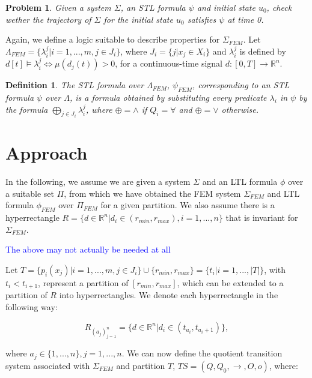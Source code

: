 \documentclass{article}
\newtheorem{definition}{Definition}
\newtheorem{problem}{Problem}
\newcommand*{\R}{\mathbb{R}}
\newcommand*{\fran}[1]{\textcolor{blue}{#1}}
\begin{document}
\begin{problem}
    Given a system $\Sigma$, an STL formula $\psi$ and initial state $u_0$,
    check wether the trajectory of $\Sigma$ for the initial state $u_0$
    satisfies $\psi$ at time 0.
\end{problem}

Again, we define a logic suitable to describe properties for $\Sigma_{FEM}$. Let
$\Lambda_{FEM} = \{\lambda_i^j | i = 1,...,m, j \in J_i\}$, where $J_i= \{j |
x_j \in X_i\}$ and $\lambda_i^j$ is defined by $d[t] \models \lambda_i^j \iff
\mu(d_j(t)) > 0$, for a continuous-time signal $d : [0, T] \to \R^n$.

\begin{definition}
    The STL formula over $\Lambda_{FEM}$, $\psi_{FEM}$, corresponding to an STL
    formula $\psi$ over $\Lambda$, is a formula obtained by substituting every
    predicate $\lambda_i$ in $\psi$ by the formula $\bigoplus_{j \in J_i}
    \lambda_i^j$, where $\oplus = \wedge$ if $Q_i = \forall$ and $\oplus = \vee$
    otherwise.
\end{definition}

\section{Approach}

In the following, we assume we are given a system $\Sigma$ and an LTL formula
$\phi$ over a suitable set $\Pi$, from which we have obtained the 
FEM system $\Sigma_{FEM}$ and LTL formula $\phi_{FEM}$ over $\Pi_{FEM}$ for a
given partition. We also assume there is a hyperrectangle $R = \{d \in \R^n |
d_i \in (r_{min}, r_{max}), i = 1,...,n\}$ that is invariant for $\Sigma_{FEM}$.

\fran{The above may not actually be needed at all}

Let $T = \{ p_i(x_j) | i = 1,...,m, j \in J_i \} \cup \{r_{min}, r_{max}\} =
\{t_i | i = 1,..., |T|\}$, with $t_i < t_{i+1}$, represent a partition of $[r_{min},
r_{max}]$, which can be extended to a partition of $R$ into hyperrectangles. We
denote each hyperrectangle in the following way:

\begin{equation}
    R_{(a_j)_{j=1}^n} = \{d \in \R^n | d_i \in (t_{a_i}, t_{a_i + 1})\},
\end{equation}

where $a_j \in \{1,...,n\}, j=1,...,n$. We can now define the quotient
transition system associated with $\Sigma_{FEM}$ and partition $T$,
$TS = (Q, Q_0, \rightarrow, O, o)$, where:
\end{document}
